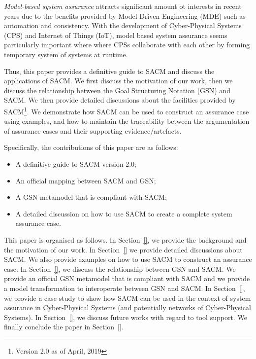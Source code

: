 \textit{Model-based system assurance} attracts significant amount ot interests in recent years due to the benefits provided by Model-Driven Engineering (MDE) such as automation and consistency. With the development of Cyber-Physical Systems (CPS) and Internet of Things (IoT), model based system assurance seems particularly important where where CPSs collaborate with each other by forming temporary system of systems at runtime.


Thus, this paper provides a definitive guide to SACM and discuss the applications of SACM. We first discuss the motivation of our work, then we discuss the relationship between the Goal Structuring Notation (GSN) and SACM. We then provide detailed discussions about the facilities provided by SACM\footnote{Version 2.0 as of April, 2019}. We demonstrate how SACM can be used to construct an assurance case using examples, and how to maintain the traceability between the argumentation of assurance cases and their supporting evidence/artefacts.

Specifically, the contributions of this paper are as follows:
\begin{itemize}
	\item A definitive guide to SACM version 2.0;
	\item An official mapping between SACM and GSN;
	\item A GSN metamodel that is compliant with SACM;
	\item A detailed discussion on how to use SACM to create a complete system assurance case.
\end{itemize}

This paper is organised as follows. In Section~\ref{}, we provide the background and the motivation of our work. In Section~\ref{} we provide detailed discussions about SACM. We also provide examples on how to use SACM to construct an assurance case. In Section~\ref{}, we discuss the relationship between GSN and SACM. We provide an official GSN metamodel that is compliant with SACM and we provide a model transformation to interoperate between GSN and SACM. In Section~\ref{}, we provide a case study to show how SACM can be used in the context of system assurance in Cyber-Physical Systems (and potentially networks of Cyber-Physical Systems). In Section~\ref{}, we discuss future works with regard to tool support. We finally conclude the paper in Section~\ref{}.

